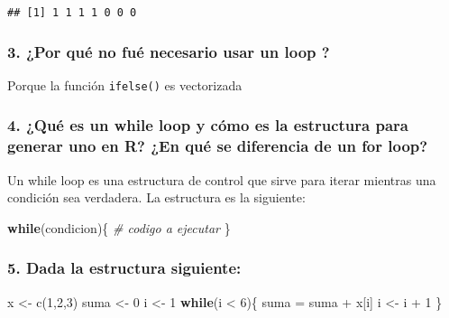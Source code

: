 \documentclass[
]{article}
\newenvironment{Shaded}{\begin{snugshade}}{\end{snugshade}}
\newcommand{\CommentTok}[1]{\textcolor[rgb]{0.56,0.35,0.01}{\textit{#1}}}
\newcommand{\ControlFlowTok}[1]{\textcolor[rgb]{0.13,0.29,0.53}{\textbf{#1}}}
\newcommand{\DecValTok}[1]{\textcolor[rgb]{0.00,0.00,0.81}{#1}}
\newcommand{\FunctionTok}[1]{\textcolor[rgb]{0.00,0.00,0.00}{#1}}
\newcommand{\NormalTok}[1]{#1}
\newcommand{\OtherTok}[1]{\textcolor[rgb]{0.56,0.35,0.01}{#1}}
\newcommand{\SpecialCharTok}[1]{\textcolor[rgb]{0.00,0.00,0.00}{#1}}
\begin{document}
\begin{verbatim}
## [1] 1 1 1 1 0 0 0
\end{verbatim}

\hypertarget{por-quuxe9-no-fuuxe9-necesario-usar-un-loop}{%
\subsubsection{3. ¿Por qué no fué necesario usar un loop
?}\label{por-quuxe9-no-fuuxe9-necesario-usar-un-loop}}

Porque la función \texttt{ifelse()} es vectorizada

\hypertarget{quuxe9-es-un-while-loop-y-cuxf3mo-es-la-estructura-para-generar-uno-en-r-en-quuxe9-se-diferencia-de-un-for-loop}{%
\subsubsection{4. ¿Qué es un while loop y cómo es la estructura para
generar uno en R? ¿En qué se diferencia de un for
loop?}\label{quuxe9-es-un-while-loop-y-cuxf3mo-es-la-estructura-para-generar-uno-en-r-en-quuxe9-se-diferencia-de-un-for-loop}}

Un while loop es una estructura de control que sirve para iterar
mientras una condición sea verdadera. La estructura es la siguiente:

\begin{Shaded}
\begin{Highlighting}[]
\ControlFlowTok{while}\NormalTok{(condicion)\{}
  \CommentTok{\# codigo a ejecutar}
\NormalTok{\}}
\end{Highlighting}
\end{Shaded}

\hypertarget{dada-la-estructura-siguiente}{%
\subsubsection{5. Dada la estructura
siguiente:}\label{dada-la-estructura-siguiente}}

\begin{Shaded}
\begin{Highlighting}[]
\NormalTok{x }\OtherTok{\textless{}{-}} \FunctionTok{c}\NormalTok{(}\DecValTok{1}\NormalTok{,}\DecValTok{2}\NormalTok{,}\DecValTok{3}\NormalTok{)}
\NormalTok{suma }\OtherTok{\textless{}{-}} \DecValTok{0}
\NormalTok{i }\OtherTok{\textless{}{-}} \DecValTok{1}
\ControlFlowTok{while}\NormalTok{(i }\SpecialCharTok{\textless{}} \DecValTok{6}\NormalTok{)\{}
\NormalTok{ suma }\OtherTok{=}\NormalTok{ suma }\SpecialCharTok{+}\NormalTok{ x[i]      }
\NormalTok{ i }\OtherTok{\textless{}{-}}\NormalTok{ i }\SpecialCharTok{+} \DecValTok{1}     
\NormalTok{\}}
\end{Highlighting}
\end{Shaded}
\end{document}

